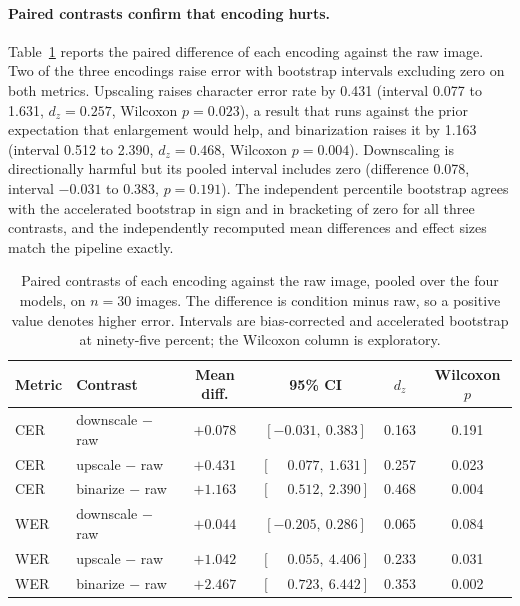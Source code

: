 \documentclass[11pt]{article}
\begin{document}
\paragraph{Paired contrasts confirm that encoding hurts.}
Table~\ref{tab:contrasts} reports the paired difference of each encoding against the raw image.
Two of the three encodings raise error with bootstrap intervals excluding zero on both metrics.
Upscaling raises character error rate by 0.431 (interval 0.077 to 1.631, $d_z = 0.257$, Wilcoxon
$p = 0.023$), a result that runs against the prior expectation that enlargement would help, and
binarization raises it by 1.163 (interval 0.512 to 2.390, $d_z = 0.468$, Wilcoxon $p = 0.004$).
Downscaling is directionally harmful but its pooled interval includes zero (difference 0.078,
interval $-0.031$ to 0.383, $p = 0.191$). The independent percentile bootstrap agrees with the
accelerated bootstrap in sign and in bracketing of zero for all three contrasts, and the
independently recomputed mean differences and effect sizes match the pipeline exactly.

\begin{table}[h]
\centering
\caption{Paired contrasts of each encoding against the raw image, pooled over the four models, on
$n = 30$ images. The difference is condition minus raw, so a positive value denotes higher error.
Intervals are bias-corrected and accelerated bootstrap at ninety-five percent; the Wilcoxon column
is exploratory.}
\label{tab:contrasts}
\begin{tabular}{llcccc}
\toprule
Metric & Contrast & Mean diff. & 95\% CI & $d_z$ & Wilcoxon $p$ \\
\midrule
CER & downscale $-$ raw & $+0.078$ & $[-0.031,\ 0.383]$ & 0.163 & 0.191 \\
CER & upscale $-$ raw   & $+0.431$ & $[\phantom{-}0.077,\ 1.631]$ & 0.257 & 0.023 \\
CER & binarize $-$ raw  & $+1.163$ & $[\phantom{-}0.512,\ 2.390]$ & 0.468 & 0.004 \\
\midrule
WER & downscale $-$ raw & $+0.044$ & $[-0.205,\ 0.286]$ & 0.065 & 0.084 \\
WER & upscale $-$ raw   & $+1.042$ & $[\phantom{-}0.055,\ 4.406]$ & 0.233 & 0.031 \\
WER & binarize $-$ raw  & $+2.467$ & $[\phantom{-}0.723,\ 6.442]$ & 0.353 & 0.002 \\
\bottomrule
\end{tabular}
\end{table}
\end{document}

